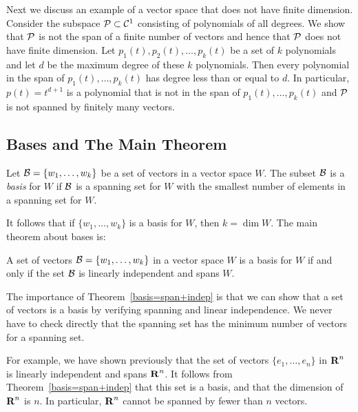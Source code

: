 Next we discuss an example of a vector space that does not have finite 
dimension.  Consider the subspace ${\cal P}\subset{\cal C}^1$ consisting of 
polynomials  of all degrees.  We show that 
${\cal P}$ is not the span of a finite number of vectors and hence that 
${\cal P}$ does not have finite dimension.  Let $p_1(t),p_2(t),\ldots,p_k(t)$ 
be a set of $k$ polynomials and let $d$ be the maximum degree of these $k$ 
polynomials.  Then every polynomial in the span of $p_1(t),\ldots,p_k(t)$ has 
degree less than or equal to $d$.  In particular, $p(t)=t^{d+1}$ is a 
polynomial that is not in the span of $p_1(t),\ldots,p_k(t)$ and ${\cal P}$ 
is not spanned by finitely many vectors.


\subsection*{Bases and The Main Theorem}

\begin{Def} \label{basis}
Let ${\cal B} = \{w_1,\ldots,w_k\}$ be a set of vectors in a
vector space $W$.  The subset ${\cal B}$ is a {\em basis\/} for $W$
if ${\cal B}$ is a spanning set for $W$ with the smallest number
of elements in a spanning set for $W$.
\end{Def}  

It follows that if $\{w_1,\ldots,w_k\}$ is a basis for $W$, then
$k=\dim W$. The main theorem about bases is:

\begin{thm}  \label{basis=span+indep}
A set of vectors ${\cal B} =\{w_1,\ldots,w_k\}$ in a vector space $W$
is a basis for $W$ if and only if the set ${\cal B}$ is linearly
independent and spans $W$.
\end{thm}   

  The importance of Theorem~\ref{basis=span+indep} is
that we can show that a set of vectors is a basis by verifying spanning
and linear independence.   We never have to check directly that the spanning
set has the minimum number of vectors for a spanning set.


For example, we have shown previously that the set of vectors
$\{e_1,\ldots,e_n\}$ in $\mbox{$\bf{R}$}^n$ is linearly independent and spans $\mbox{$\bf{R}$}^n$.  It
follows from Theorem~\ref{basis=span+indep} that this set is a basis,
and that the dimension of $\mbox{$\bf{R}$}^n$ is $n$.
In particular, $\mbox{$\bf{R}$}^n$ cannot be spanned by fewer than $n$ vectors.

